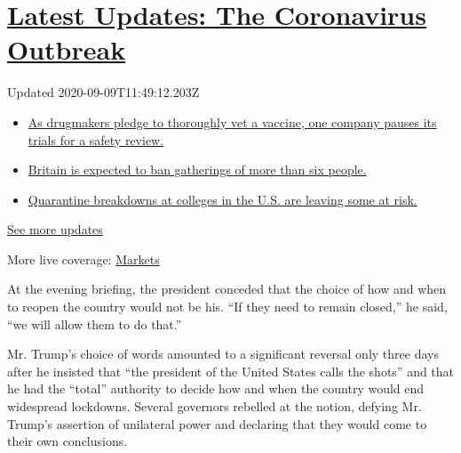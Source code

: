 \hypertarget{latest-updates-the-coronavirus-outbreak}{%
\section{\texorpdfstring{\href{https://www.nytimes3xbfgragh.onion/2020/09/09/world/covid-19-coronavirus.html?action=click\&pgtype=Article\&state=default\&region=MAIN_CONTENT_1\&context=storylines_live_updates}{Latest
Updates: The Coronavirus
Outbreak}}{Latest Updates: The Coronavirus Outbreak}}\label{latest-updates-the-coronavirus-outbreak}}

Updated 2020-09-09T11:49:12.203Z

\begin{itemize}
\tightlist
\item
  \href{https://www.nytimes3xbfgragh.onion/2020/09/09/world/covid-19-coronavirus.html?action=click\&pgtype=Article\&state=default\&region=MAIN_CONTENT_1\&context=storylines_live_updates\#link-70cea8bb}{As
  drugmakers pledge to thoroughly vet a vaccine, one company pauses its
  trials for a safety review.}
\item
  \href{https://www.nytimes3xbfgragh.onion/2020/09/09/world/covid-19-coronavirus.html?action=click\&pgtype=Article\&state=default\&region=MAIN_CONTENT_1\&context=storylines_live_updates\#link-780eaa2f}{Britain
  is expected to ban gatherings of more than six people.}
\item
  \href{https://www.nytimes3xbfgragh.onion/2020/09/09/world/covid-19-coronavirus.html?action=click\&pgtype=Article\&state=default\&region=MAIN_CONTENT_1\&context=storylines_live_updates\#link-11cec4c0}{Quarantine
  breakdowns at colleges in the U.S. are leaving some at risk.}
\end{itemize}

\href{https://www.nytimes3xbfgragh.onion/2020/09/09/world/covid-19-coronavirus.html?action=click\&pgtype=Article\&state=default\&region=MAIN_CONTENT_1\&context=storylines_live_updates}{See
more updates}

More live coverage:
\href{https://www.nytimes3xbfgragh.onion/live/2020/09/09/business/stock-market-today-coronavirus?action=click\&pgtype=Article\&state=default\&region=MAIN_CONTENT_1\&context=storylines_live_updates}{Markets}

At the evening briefing, the president conceded that the choice of how
and when to reopen the country would not be his. ``If they need to
remain closed,'' he said, ``we will allow them to do that.''

Mr. Trump's choice of words amounted to a significant reversal only
three days after he insisted that ``the president of the United States
calls the shots'' and that he had the ``total'' authority to decide how
and when the country would end widespread lockdowns. Several governors
rebelled at the notion, defying Mr. Trump's assertion of unilateral
power and declaring that they would come to their own conclusions.

